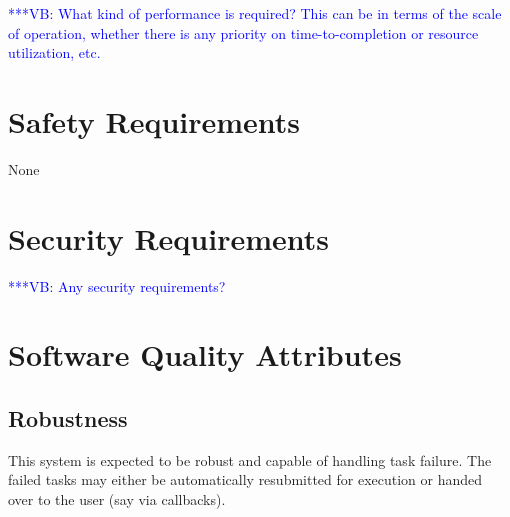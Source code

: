 \documentclass{scrreprt}
\newcommand{\vbnote}[1]{ {\textcolor{blue} { ***VB: #1 }}}
\newcommand{\vbnote}[1]{}
\begin{document}
\vbnote{What kind of performance is required? This can be in terms of the scale of operation, whether there is any priority on time-to-completion or resource utilization, etc.}

\section{Safety Requirements}
None

\section{Security Requirements}

\vbnote{Any security requirements?}

\section{Software Quality Attributes}

\subsection{Robustness}

This system is expected to be robust and capable of handling task failure. The failed tasks may either be automatically resubmitted for execution or handed over to the user (say via callbacks). 
\end{document}
